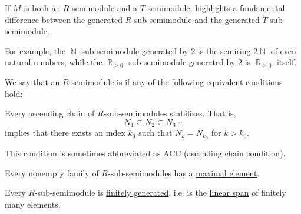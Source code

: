\begin{remark}\label{rem:span_over_different_semirings}
  If \( M \) is both an \( R \)-semimodule and a \( T \)-semimodule,  highlights a fundamental difference between the generated \( R \)-sub-semimodule and the generated \( T \)-sub-semimodule.

  For example, the \( \BbbN \)-sub-semimodule generated by \( 2 \) is the semiring \( 2\BbbN \) of even natural numbers, while the \( \BbbR_{\geq 0} \)-sub-semimodule generated by \( 2 \) is \( \BbbR_{\geq 0} \) itself.
\end{remark}

\begin{definition}\label{def:noetherian_semimodule}
  We say that an \( R \)-\hyperref[def:semimodule]{semimodule} is  if any of the following equivalent conditions hold:
  \begin{thmenum}
     Every ascending chain of \( R \)-sub-semimodules stabilizes. That is,
    \begin{equation*}
      N_1 \subseteq N_2 \subseteq N_3 \cdots
    \end{equation*}
    implies that there exists an index \( k_0 \) such that \( N_k = N_{k_0} \) for \( k > k_0 \).

    This condition is sometimes abbreviated as ACC (ascending chain condition).

     Every nonempty family of \( R \)-sub-semimodules has a \hyperref[def:partially_ordered_set_extremal_points/maximal_and_minimal_element]{maximal element}.

     Every \( R \)-sub-semimodule is \hyperref[def:module_presentation]{finitely generated}, i.e. is the \hyperref[def:semimodule/submodel]{linear span} of finitely many elements.
  \end{thmenum}
\end{definition}
